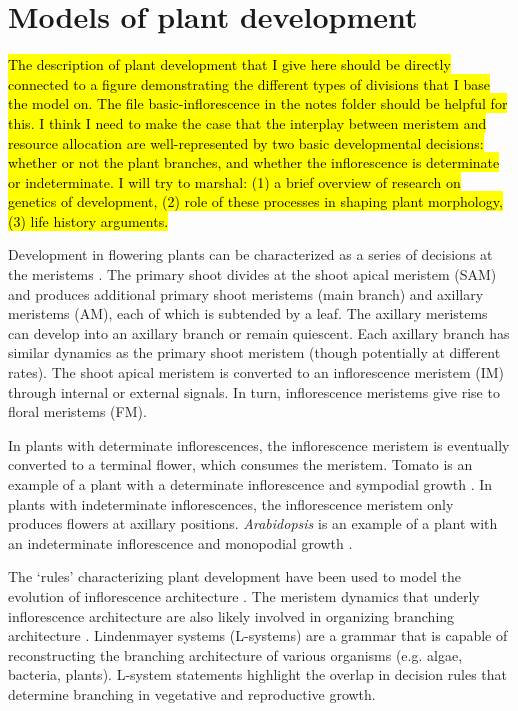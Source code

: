 \documentclass[12pt, oneside]{article}   	%
\begin{document}
\section{Models of plant development}

\hl{ The description of plant development that I give here should be directly connected to a figure demonstrating the different types of divisions that I base the model on. The file basic-inflorescence in the notes folder should be helpful for this. I think I need to make the case that the interplay between meristem and resource allocation are well-represented by two basic developmental decisions: whether or not the plant branches, and whether the inflorescence is determinate or indeterminate. I will try to marshal: (1) a brief overview of research on genetics of development, (2) role of these processes in shaping plant morphology, (3) life history arguments. }

Development in flowering plants can be characterized as a series of decisions at the meristems \cite{kellogg2000}. The primary shoot divides at the shoot apical meristem (SAM) and produces additional primary shoot meristems (main branch) and axillary meristems (AM), each of which is subtended by a leaf. The axillary meristems can develop into an axillary branch or remain quiescent. Each axillary branch has similar dynamics as the primary shoot meristem (though potentially at different rates). The shoot apical meristem is converted to an inflorescence meristem (IM) through internal or external signals. In turn, inflorescence meristems give rise to floral meristems (FM). 

In plants with determinate inflorescences, the inflorescence meristem is eventually converted to a terminal flower, which consumes the meristem. Tomato is an example of a plant with a determinate inflorescence and sympodial growth \cite{Park2012}. In plants with indeterminate inflorescences, the inflorescence meristem only produces flowers at axillary positions. \textit{Arabidopsis} is an example of a plant with an indeterminate inflorescence and monopodial growth \cite{bradley1997a}. 

The `rules' characterizing plant development have been used to model the evolution of inflorescence architecture \cite{Prusinkiewicz2007}. The meristem dynamics that underly inflorescence architecture are also likely involved in organizing branching architecture \cite{Park2012}. Lindenmayer systems (L-systems) are a grammar that is capable of reconstructing the branching architecture of various organisms (e.g. algae, bacteria, plants). L-system statements highlight the overlap in decision rules that determine branching in vegetative and reproductive growth. 
\end{document}
